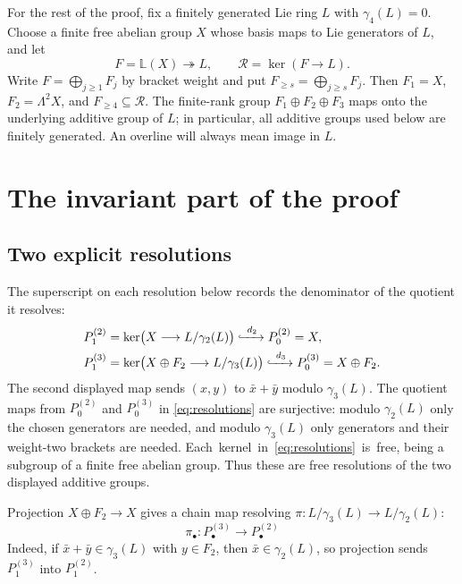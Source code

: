 \documentclass[11pt]{amsart}
\newcommand{\gm}{\gamma}
\newcommand{\Rel}{\mathcal R}
\begin{document}
For the rest of the proof, fix a finitely generated Lie ring $L$ with
$\gm_4(L)=0$.  Choose a finite free abelian group $X$ whose basis maps
to Lie generators of $L$, and let
\[
 F=\mathbb L(X)\twoheadrightarrow L,
 \qquad \Rel=\ker(F\to L).
\]
Write $F=\bigoplus_{j\geq1}F_j$ by bracket weight and put
$F_{\geq s}=\bigoplus_{j\geq s}F_j$.  Then
$F_1=X$, $F_2=\Lambda^2X$, and $F_{\geq4}\subseteq\Rel$.
The finite-rank group $F_1\oplus F_2\oplus F_3$ maps onto the
underlying additive group of $L$; in particular, all additive groups
used below are finitely generated.
An overline will always mean image in $L$.

\section{The invariant part of the proof}

\subsection{Two explicit resolutions}

The superscript on each resolution below records the denominator of
the quotient it resolves:
\begin{equation}\label{eq:resolutions}
 \begin{aligned}
 P^{(2)}_1&=\ker\bigl(X\longrightarrow L/\gm_2(L)\bigr)
       \xhookrightarrow{\ d_2\ }P^{(2)}_0=X,\\
 P^{(3)}_1&=\ker\bigl(X\oplus F_2\longrightarrow L/\gm_3(L)\bigr)
       \xhookrightarrow{\ d_3\ }P^{(3)}_0=X\oplus F_2.
 \end{aligned}
\end{equation}
The second displayed map sends $(x,y)$ to $\bar x+\bar y$ modulo
$\gm_3(L)$.  The quotient maps from $P^{(2)}_0$ and $P^{(3)}_0$ in
\eqref{eq:resolutions} are surjective: modulo $\gm_2(L)$ only
the chosen generators are needed, and modulo $\gm_3(L)$ only
generators and their weight-two brackets are needed.
\mbox{Each kernel in \eqref{eq:resolutions} is free}, being a subgroup of a finite free
abelian group.  Thus these are free resolutions of the two displayed
additive groups.

Projection $X\oplus F_2\to X$ gives a chain map resolving
$\pi:L/\gm_3(L)\to L/\gm_2(L)$:
\begin{equation}\label{eq:pi-chain}
 \pi_\bullet:P^{(3)}_\bullet\longrightarrow P^{(2)}_\bullet
\end{equation}
Indeed, if
$\bar x+\bar y\in\gm_3(L)$ with $y\in F_2$, then
$\bar x\in\gm_2(L)$, so projection sends $P^{(3)}_1$ into
$P^{(2)}_1$.
\end{document}
